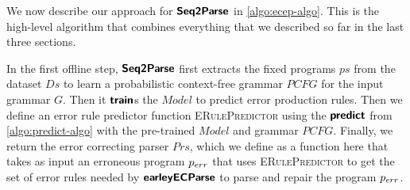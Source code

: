 

We now describe our approach for $\bm{\mathsf{Seq2Parse}}$ in \autoref{algo:ecep-algo}. This
is the high-level algorithm that combines everything that we described so far in
the last three sections.

In the first offline step, $\bm{\mathsf{Seq2Parse}}$ first extracts the fixed programs $ps$
from the dataset $Ds$ to learn a probabilistic context-free grammar $PCFG$ for
the input grammar $G$. Then it $\bm{\mathsf{train}}$s the $Model$ to predict error
production rules. Then we define an error rule predictor function
\textsc{ERulePredictor} using the $\bm{\mathsf{predict}}$ from \autoref{algo:predict-algo}
with the pre-trained $Model$ and grammar $PCFG$. Finally, we return the error
correcting parser $Prs$, which we define as a function here that takes as input
an erroneous program $p_{err}$ that uses \textsc{ERulePredictor} to get the set of
error rules needed by $\bm{\mathsf{earleyECParse}}$ to parse and repair the program $p_{err}$.
